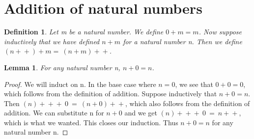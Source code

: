 \documentclass{article}
\newtheorem{definition}{Definition}
\newtheorem{lemma}{Lemma}
\newcommand{\inc}[1]{\mathrel{{{#1}+}+}}
\begin{document}
\section{Addition of natural numbers}

\begin{definition}
Let m be a natural number. We define $0 + m = m$. Now suppose inductively that we have defined $n + m$ for a natural number n. Then we define $(\inc{n}) + m = \ \inc{(n+m)}$. 
\end{definition}

\begin{lemma}
For any natural number n, $n + 0 = n$.
\end{lemma}

\begin{proof}
We will induct on n. In the base case where $n = 0$, we see that $0 + 0 = 0$, which follows from the definition of addition. Suppose inductively that $n + 0 = n$. Then $\inc{(n)} + \ 0 \ = \ \inc{(n+0)}$, which also follows from the definition of addition. We can substitute n for $n + 0$ and we get $\inc{(n)} + \ 0 \ = \ \inc{n}$, which is what we wanted. This closes our induction. Thus $n + 0 = n$ for any natural number n.
\end{proof}
\end{document}
